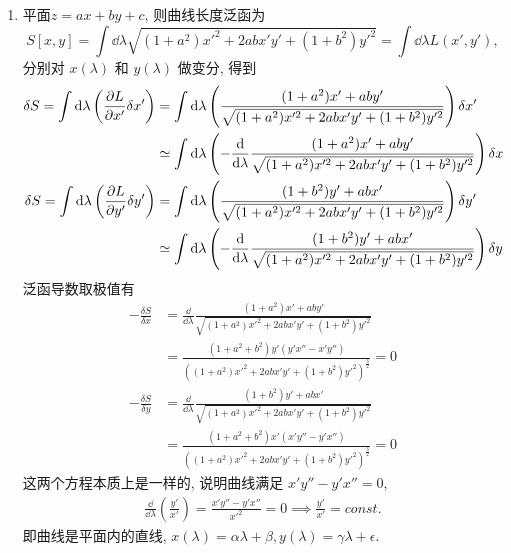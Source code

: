 \begin{solution}
\begin{enumerate}[label=(\arabic*)]
        \begin{enumerate}[label=(\arabic{enumi}.\arabic*)]
            \item 平面\( z = ax + by + c \), 则曲线长度泛函为
            \[
                S[x,y] = \int \dd \lambda \sqrt{(1 + a^2) x'^2 + 2 a b x' y' + (1 + b^2) y'^2} = \int \dd \lambda L\left(x',y'\right),
            \]
            分别对 \(x(\lambda)\) 和 \(y(\lambda)\) 做变分, 得到
            \begin{align*}
                \delta S = \int \dd \lambda \left(\frac{\partial L}{\partial x'} \delta x'\right) &= \int \dd \lambda \left(\frac{(1 + a^2)x' + ab y'}{\sqrt{(1 + a^2) x'^2 + 2 a b x' y' + (1 + b^2) y'^2}}\right) \delta x' \\
                &\simeq \int \dd \lambda \left(- \frac{\dd}{\dd \lambda} \frac{(1 + a^2)x' + ab y'}{\sqrt{(1 + a^2) x'^2 + 2 a b x' y' + (1 + b^2) y'^2}}\right) \delta x \\
                \delta S = \int \dd \lambda \left(\frac{\partial L}{\partial y'} \delta y'\right) &= \int \dd \lambda \left(\frac{(1 + b^2)y' + ab x'}{\sqrt{(1 + a^2) x'^2 + 2 a b x' y' + (1 + b^2) y'^2}}\right) \delta y' \\
                &\simeq \int \dd \lambda \left(- \frac{\dd}{\dd \lambda} \frac{(1 + b^2)y' + ab x'}{\sqrt{(1 + a^2) x'^2 + 2 a b x' y' + (1 + b^2) y'^2}}\right) \delta y
            \end{align*}
            泛函导数取极值有
            \begin{align*}
                -\frac{\delta S}{\delta x} &= \frac{\dd}{\dd \lambda} \frac{(1 + a^2)x' + ab y'}{\sqrt{(1 + a^2) x'^2 + 2 a b x' y' + (1 + b^2) y'^2}} \\
                &=  \frac{(1 + a^2 + b^2) y' (y' x'' - x' y'')}{\left((1 + a^2) x'^2 + 2 a b x' y' + (1 + b^2) y'^2\right)^{\frac{3}{2}}} = 0 \\
                -\frac{\delta S}{\delta y} &= \frac{\dd}{\dd \lambda} \frac{(1 + b^2)y' + ab x'}{\sqrt{(1 + a^2) x'^2 + 2 a b x' y' + (1 + b^2) y'^2}} \\
                &=  \frac{(1 + a^2 + b^2) x' (x' y'' - y' x'')}{\left((1 + a^2) x'^2 + 2 a b x' y' + (1 + b^2) y'^2\right)^{\frac{3}{2}}} = 0
            \end{align*}
            这两个方程本质上是一样的, 说明曲线满足 \(x' y'' - y' x'' = 0\),
            \begin{align*}
                \frac{\dd}{\dd \lambda} \left(\frac{y'}{x'}\right) = \frac{x' y'' - y' x''}{x'^2} = 0  \implies \frac{y'}{x'} = const.
            \end{align*}
            即曲线是平面内的直线, \(x(\lambda) = \alpha \lambda + \beta, y(\lambda) = \gamma \lambda + \epsilon.\)


\end{enumerate}
\end{enumerate}
\end{solution}
